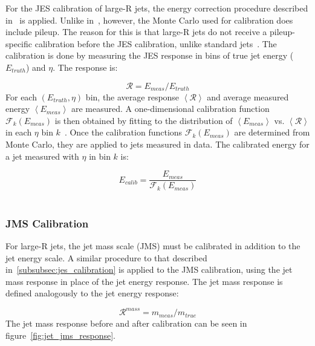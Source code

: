 For the JES calibration of large-R jets, the energy correction procedure described in~\cite{jet-energy-measurement} is applied.
Unlike in~\cite{jet-energy-measurement}, however, the Monte Carlo used for calibration does include pileup.
The reason for this is that large-R jets do not receive a pileup-specific calibration before the JES calibration, unlike standard jets~\cite{jet-substructure-perf}.
The calibration is done by measuring the JES response in bins of true jet energy ($E_{truth}$) and $\eta$.
The response is:

\begin{equation}\label{eq:jet_jes_response}
    \mathcal{R} = E_{meas} / E_{truth}
\end{equation}
For each $\left(E_{truth}, \eta\right)$ bin, the average response $\left<\mathcal{R}\right>$
and average measured energy $\left<E_{meas}\right>$ are measured.
A one-dimensional calibration function $\mathcal{F}_k\left(E_{meas}\right)$ is then obtained by fitting to the distribution of $\left<E_{meas}\right>$ vs. $\left<\mathcal{R}\right>$ in each $\eta$ bin $k$~\cite{jet-energy-measurement}.
Once the calibration functions $\mathcal{F}_k(E_{meas})$ are determined from Monte Carlo, they are applied to jets measured in data.
The calibrated energy for a jet measured with $\eta$ in bin $k$ is:

\begin{equation}\label{eq:jet_jes_calibration}
    E_{calib} = \frac{E_{meas}}{\mathcal{F}_k\left(E_{meas}\right)}
\end{equation}~\cite{jet-energy-measurement}

\subsubsection{JMS Calibration}\label{subsubsec:jms_calibration}

For large-R jets, the jet mass scale (JMS) must be calibrated in addition to the jet energy scale.
A similar procedure to that described in~\ref{subsubsec:jes_calibration} is applied to the JMS calibration, using the jet mass response in place of the jet energy response.
The jet mass response is defined analogously to the jet energy response:

\begin{equation}\label{eq:jet_mass_response}
    \mathcal{R}^{mass} = m_{meas} / m_{true}
\end{equation}
The jet mass response before and after calibration can be seen in figure~\ref{fig:jet_jms_response}.

